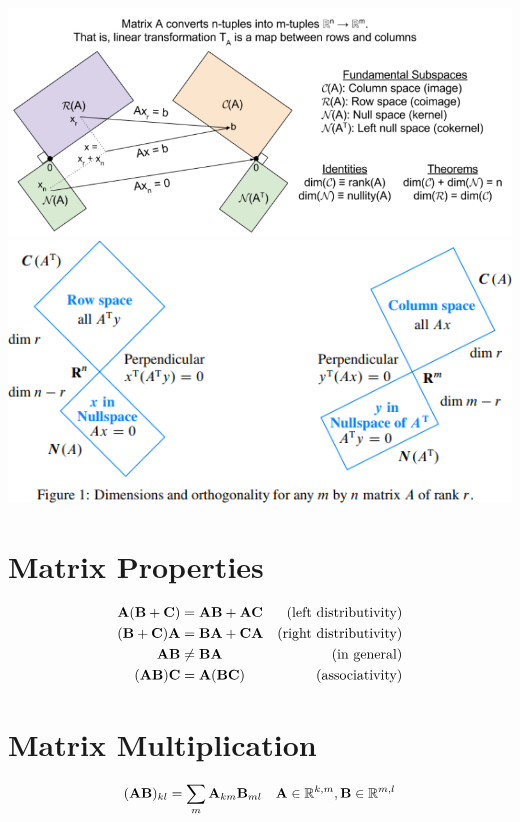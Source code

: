 \begin{center}
\includegraphics[width=\textwidth]{imgs/fund_theorem_lin_alg4.png}
\includegraphics[width=\textwidth]{imgs/fund_theorem_lin_alg5.png}
\end{center}


\section{Matrix Properties}

\begin{align}
\mathbf{A}(\mathbf{B}+\mathbf{C}) &=   \mathbf{A}\mathbf{B}+\mathbf{A}\mathbf{C} &\textrm{(left distributivity)}   \\
(\mathbf{B}+\mathbf{C})\mathbf{A} &=   \mathbf{B}\mathbf{A}+\mathbf{C}\mathbf{A} &\textrm{(right distributivity)}  \\
\mathbf{A}\mathbf{B}       &\ne \mathbf{B}\mathbf{A}        &\textrm{(in general)}            \\
(\mathbf{A}\mathbf{B})\mathbf{C}  &=   \mathbf{A}(\mathbf{B}\mathbf{C})   &\textrm{(associativity)}
\end{align}

\section{Matrix Multiplication}

\begin{equation}
(\mathbf{A}\mathbf{B})_{kl} = \sum_m \mathbf{A}_{km}\mathbf{B}_{ml}~~~\mathbf{A}\in\mathbb{R}^{k,m},\mathbf{B}\in\mathbb{R}^{m,l}
\end{equation}


